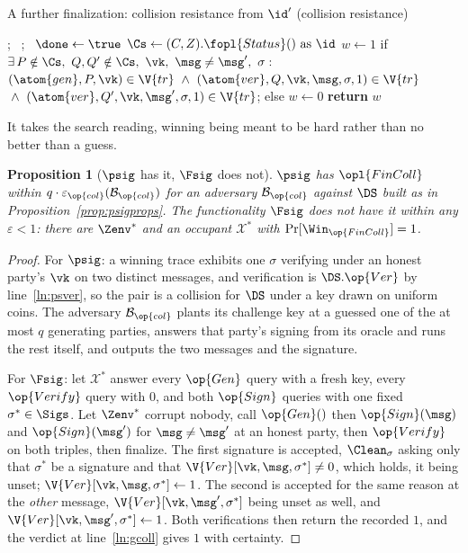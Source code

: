 \documentclass[10pt,oneside,openany]{book}
\theoremstyle{accentdef}
\theoremstyle{accentplain}
\newtheorem{proposition}[definition]{Proposition}
\begin{document}
\begin{interface}[nofloat]{A further finalization: collision resistance}
 \quad from $\id'$ \quad (collision resistance)
\begin{algorithmic}[1]
\setcounter{contline}{0}\algcont
\Req{$\neg\done$}; \ ; \ $\done \gets \true$
\State $\Cs \gets (C,Z).\fopl{Status}() \text{ as } \id$
\State $w \gets 1$ if $\exists\, P \notin \Cs,\ Q,Q' \notin \Cs,\ \vk,\ \msg \neq \msg',\ \sigma :$ \label{ln:gcoll}
\State \quad $(\atom{gen},P,\vk) \in \V{tr}
       \ \wedge\ (\atom{ver},Q,\vk,\msg,\sigma,1) \in \V{tr}$
\State \quad ${}\wedge\ (\atom{ver},Q',\vk,\msg',\sigma,1) \in \V{tr}$; \quad else $w \gets 0$
\State \textbf{return} $w$
\algsave
\end{algorithmic}
\end{interface}

It takes the search reading, winning being meant to be hard rather than no better than a guess.

\begin{proposition}[$\psig$ has it, $\Fsig$ does not]\label{prop:sigcoll}
$\psig$ has $\opl{FinColl}$ within $q \cdot \varepsilon_{\op{col}}(\mathcal{B}_{\op{col}})$ for an
adversary $\mathcal{B}_{\op{col}}$ against $\DS$ built as in
Proposition~\ref{prop:psigprops}. The functionality $\Fsig$ does not have it within any $\varepsilon < 1$: there
are $\Zenv^{*}$ and an occupant $\mathcal{X}^{*}$ with $\Pr[\Win_{\op{FinColl}}] = 1$.
\end{proposition}

\begin{proof}
For $\psig$: a winning trace exhibits one $\sigma$ verifying under an honest party's $\vk$ on two
distinct messages, and verification is $\DS.\op{Ver}$ by line~\ref{ln:psver}, so the pair is a
collision for $\DS$ under a key drawn on uniform coins. The adversary $\mathcal{B}_{\op{col}}$ plants its
challenge key at a guessed one of the at most $q$ generating parties, answers that party's signing
from its oracle and runs the rest itself, and outputs the two messages and the signature.

For $\Fsig$: let $\mathcal{X}^{*}$ answer every $\op{Gen}$ query with a fresh key, every
$\op{Verify}$ query with $0$, and both $\op{Sign}$ queries with one fixed $\sigma^{*} \in \Sigs$.
Let $\Zenv^{*}$ corrupt nobody, call $\op{Gen}()$ then $\op{Sign}(\msg)$ and $\op{Sign}(\msg')$
for $\msg \neq \msg'$ at an honest party, then $\op{Verify}$ on both triples, then finalize. The
first signature is accepted, $\Clean_{\sigma}$ asking only that $\sigma^{*}$ be a signature and
that $\V{Ver}[\vk,\msg,\sigma^{*}] \neq 0$, which holds, it being unset; $\V{Ver}[\vk,\msg,
\sigma^{*}] \gets 1$. The second is accepted for the same reason at the \emph{other} message,
$\V{Ver}[\vk,\msg',\sigma^{*}]$ being unset as well, and $\V{Ver}[\vk,\msg',\sigma^{*}] \gets 1$.
Both verifications then return the recorded $1$, and the verdict at line~\ref{ln:gcoll} gives $1$
with certainty.
\end{proof}
\end{document}

